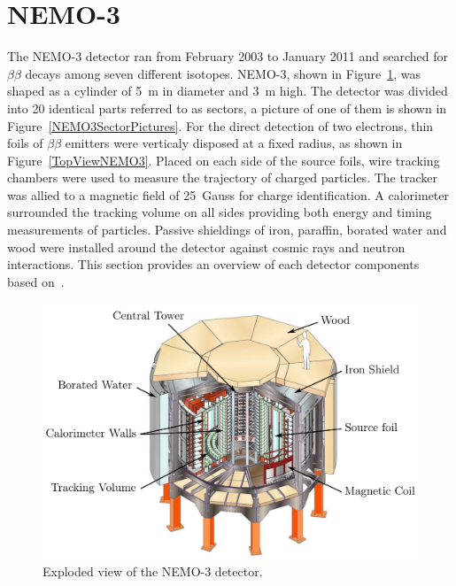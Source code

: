 \documentclass[main.tex]{subfiles}
\begin{document}
\FloatBarrier


\section{NEMO-3}\label{sec:NEMO3}


\NI The NEMO-3 detector ran from February 2003 to January 2011 and searched for $\beta\beta$ decays among seven different isotopes. NEMO-3, shown in Figure~\ref{NEMO3Detector}, was shaped as a cylinder of 5~m in diameter and 3~m high. The detector was divided into 20 identical parts referred to as sectors, a picture of one of them is shown in Figure~\ref{NEMO3SectorPictures}. For the direct detection of two electrons, thin foils of $\beta\beta$ emitters were verticaly disposed at a fixed radius, as shown in Figure~\ref{TopViewNEMO3}. Placed on each side of the source foils, wire tracking chambers were used to measure the trajectory of charged particles. The tracker was allied to a magnetic field of 25~Gauss for charge identification. A calorimeter surrounded the tracking volume on all sides providing both energy and timing measurements of particles. Passive shieldings of iron, paraffin, borated water and wood were installed around the detector against cosmic rays and neutron interactions. This section provides an overview of each detector components based on~\cite{NEMO-3-detector}. 


\begin{figure}[h!]
\begin{center}
\includegraphics[scale=0.35]{pictures/Chap2/NEMO-3-Schema.png}
\caption{Exploded view of the NEMO-3 detector.}
\label{NEMO3Detector}
\end{center}
\end{figure}
\end{document}
